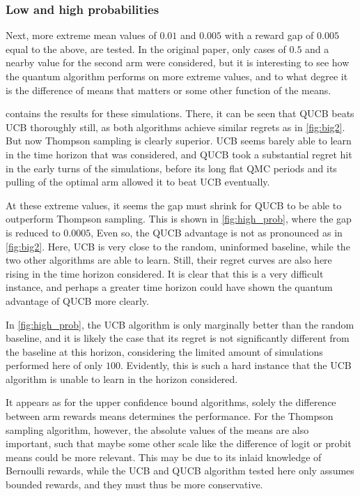 \clearpage

\vspace*{0.5cm plus 0.5cm minus 0.5cm}
\subsubsection{Low and high probabilities}
Next, more extreme mean values of $0.01$ and $0.005$ with a reward gap of $0.005$ equal to the above, are tested.
In the original paper, only cases of $0.5$ and a nearby value for the second arm were considered, but it is interesting to see how the quantum algorithm performs on more extreme values, and to what degree it is the difference of means that matters or some other function of the means.

 contains the results for these simulations.
There, it can be seen that QUCB beats UCB thoroughly still, as both algorithms achieve similar regrets as in \cref{fig:big2}.
But now Thompson sampling is clearly superior.
UCB seems barely able to learn in the time horizon that was considered, and QUCB took a substantial regret hit in the early turns of the simulations, before its long flat QMC periods and its pulling of the optimal arm allowed it to beat UCB eventually.

At these extreme values, it seems the gap must shrink for QUCB to be able to outperform Thompson sampling.
This is shown in \cref{fig:high_prob}, where the gap is reduced to $0.0005$,
Even so, the QUCB advantage is not as pronounced as in \cref{fig:big2}.
Here, UCB is very close to the random, uninformed baseline, while the two other algorithms are able to learn.
Still, their regret curves are also here rising in the time horizon considered.
It is clear that this is a very difficult instance, and perhaps a greater time horizon could have shown the quantum advantage of QUCB more clearly.

In \cref{fig:high_prob}, the UCB algorithm is only marginally better than the random baseline, and it is likely the case that its regret is not significantly different from the baseline at this horizon, considering the limited amount of simulations performed here of only $100$.
Evidently, this is such a hard instance that the UCB algorithm is unable to learn in the horizon considered.

It appears as for the upper confidence bound algorithms, solely the difference between arm rewards means determines the performance.
For the Thompson sampling algorithm, however, the absolute values of the means are also important, such that maybe some other scale like the difference of logit or probit means could be more relevant.
This may be due to its inlaid knowledge of Bernoulli rewards, while the UCB and QUCB algorithm tested here only assumes bounded rewards, and they must thus be more conservative.

